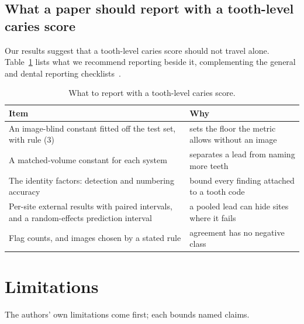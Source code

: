 \documentclass[conference]{IEEEtran}
\begin{document}
\subsection{What a paper should report with a tooth-level caries score}

Our results suggest that a tooth-level caries score should not travel alone. Table~\ref{tab:7} lists what we recommend reporting beside it, complementing the general and dental reporting checklists~\cite{mongan2020claim,schwendicke2021checklist}.

\begin{table}[t]
\centering
\caption{What to report with a tooth-level caries score.}
\label{tab:7}
\footnotesize
\setlength{\tabcolsep}{3pt}
\begin{tabular}{>{\raggedright\arraybackslash}p{4.73cm}>{\raggedright\arraybackslash}p{3.03cm}}
\toprule
Item & Why \\
\midrule
An image-blind constant fitted off the test set, with rule (3) & sets the floor the metric allows without an image \\
A matched-volume constant for each system & separates a lead from naming more teeth \\
The identity factors: detection and numbering accuracy & bound every finding attached to a tooth code \\
Per-site external results with paired intervals, and a random-effects prediction interval & a pooled lead can hide sites where it fails \\
Flag counts, and images chosen by a stated rule & agreement has no negative class \\
\bottomrule
\end{tabular}
\end{table}

\section{Limitations}

The authors' own limitations come first; each bounds named claims.
\end{document}

